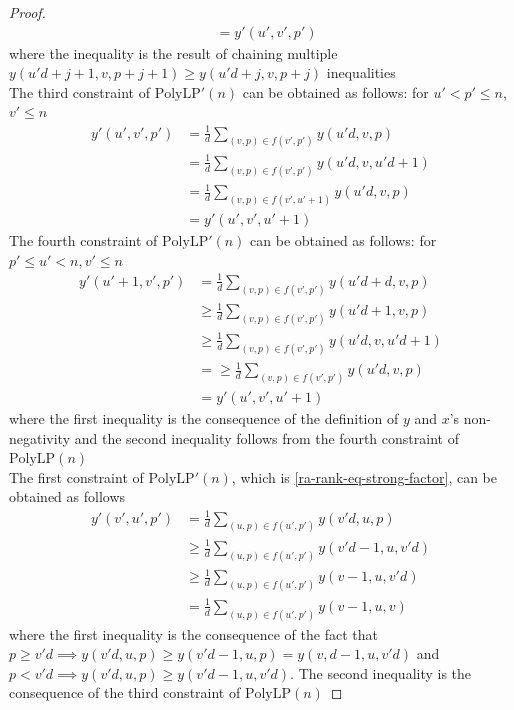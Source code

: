 \begin{proof}
\begin{align*}
						 &=y'(u',v',p')
	\end{align*}
	where the inequality is the result of chaining multiple $y(u'd+j+1,v,p+j+1)\geq y(u'd+j,v,p+j)$ inequalities\\
	The third constraint of $\mathrm{PolyLP'}(n)$ can be obtained as follows: for $u'<p'\leq n$, $v'\leq n$
	\begin{align*}
		y'(u',v',p')&=\frac{1}{d}\sum\limits_{(v,p)\in f(v',p')}y(u'd,v,p)\\
		            &=\frac{1}{d}\sum\limits_{(v,p)\in f(v',p')}y(u'd,v,u'd+1)\\
					&=\frac{1}{d}\sum\limits_{(v,p)\in f(v',u'+1)}y(u'd,v,p)\\
					&=y'(u',v',u'+1)
	\end{align*}
	The fourth constraint of $\mathrm{PolyLP'}(n)$ can be obtained as follows: for $p'\leq u'< n, v'\leq n$
	\begin{align*}
		y'(u'+1,v',p')&=\frac{1}{d}\sum\limits_{(v,p)\in f(v',p')}y(u'd+d,v,p)\\
		              &\geq\frac{1}{d}\sum\limits_{(v,p)\in f(v',p')}y(u'd+1,v,p)\\
					  &\geq\frac{1}{d}\sum\limits_{(v,p)\in f(v',p')}y(u'd,v,u'd+1)\\
					  &=\geq\frac{1}{d}\sum\limits_{(v,p)\in f(v',p')}y(u'd,v,p)\\
					  &=y'(u',v',u'+1)
	\end{align*}
	where the first inequality is the consequence of the definition of $y$ and $x$'s non-negativity and the second inequality follows from the fourth constraint of $\mathrm{PolyLP}(n)$\\
	The first constraint of $\mathrm{PolyLP'}(n)$, which is \autoref{ra-rank-eq-strong-factor}, can be obtained as follows
	\begin{align*}
		y'(v',u',p')&=\frac{1}{d}\sum\limits_{(u,p)\in f(u',p')}y(v'd,u,p)\\
		            &\geq \frac{1}{d}\sum\limits_{(u,p)\in f(u',p')}y(v'd-1,u,v'd)\\
					&\geq \frac{1}{d}\sum\limits_{(u,p)\in f(u',p')}y(v-1,u,v'd)\\
					&=\frac{1}{d}\sum\limits_{(u,p)\in f(u',p')}y(v-1,u,v)
	\end{align*}
	where the first inequality is the consequence of the fact that $p\geq v'd\implies y(v'd,u,p)\geq\allowbreak y(v'd-1,u,p)=y(v,d-1,u,v'd)$ and $p<v'd\implies y(v'd,u,p)\geq y(v'd-1,u,v'd)$. The second inequality is the consequence of the third constraint of $\mathrm{PolyLP}(n)$

\end{proof}
